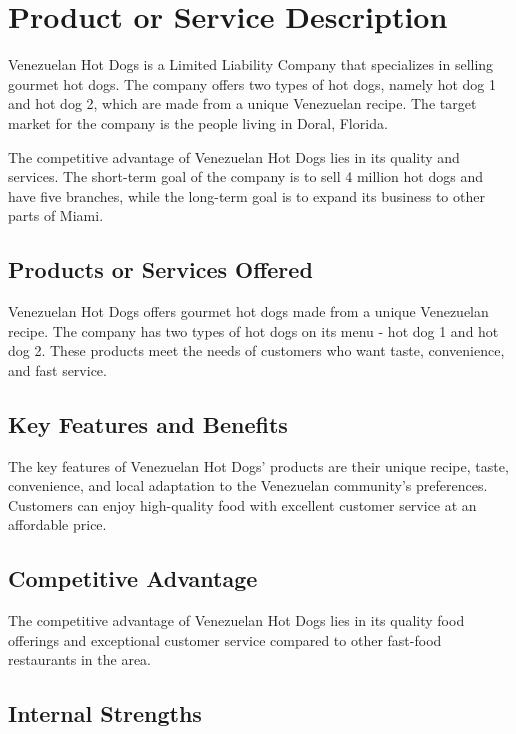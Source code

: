 \section{Product or Service Description}\label{sec:product}

Venezuelan Hot Dogs is a Limited Liability Company that specializes in selling gourmet hot dogs. The company offers two types of hot dogs, namely hot dog 1 and hot dog 2, which are made from a unique Venezuelan recipe. The target market for the company is the people living in Doral, Florida. 

The competitive advantage of Venezuelan Hot Dogs lies in its quality and services. The short-term goal of the company is to sell 4 million hot dogs and have five branches, while the long-term goal is to expand its business to other parts of Miami.

\subsection{Products or Services Offered}

Venezuelan Hot Dogs offers gourmet hot dogs made from a unique Venezuelan recipe. The company has two types of hot dogs on its menu - hot dog 1 and hot dog 2. These products meet the needs of customers who want taste, convenience, and fast service.

\subsection{Key Features and Benefits}

The key features of Venezuelan Hot Dogs' products are their unique recipe, taste, convenience, and local adaptation to the Venezuelan community's preferences. Customers can enjoy high-quality food with excellent customer service at an affordable price.

\subsection{Competitive Advantage}

The competitive advantage of Venezuelan Hot Dogs lies in its quality food offerings and exceptional customer service compared to other fast-food restaurants in the area.

\subsection{Internal Strengths}

